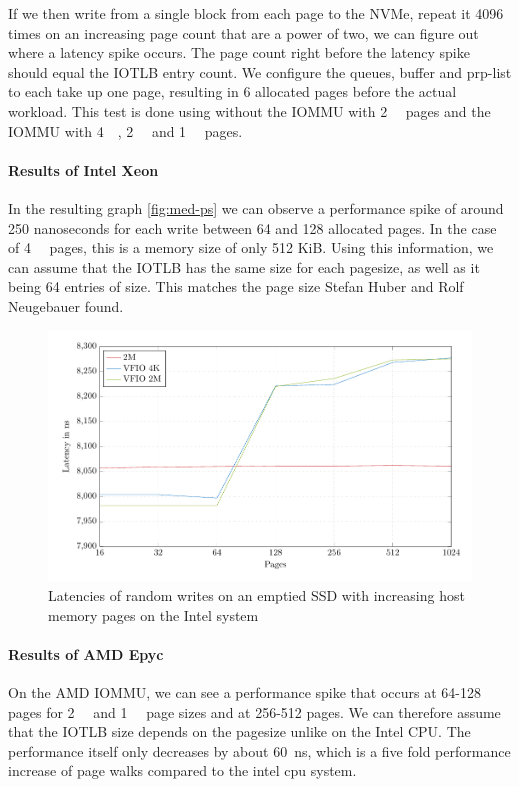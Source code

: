 If we then write from a single block from each page to the NVMe, repeat it 4096 times on an increasing page count that are a power of two, we can figure out where a latency spike occurs. The page count right before the latency spike should equal the IOTLB entry count. We configure the queues, buffer and prp-list to each take up one page, resulting in 6 allocated pages before the actual workload. This test is done using without the IOMMU with \qty{2}{\mebi\byte} pages and the IOMMU with \qty{4}{\kibi\byte}, \qty{2}{\mebi\byte} and \qty{1}{\gibi\byte} pages.

\paragraph{Results of Intel Xeon}

In the resulting graph \autoref{fig:med-ps} we can observe a performance spike of around 250 nanoseconds for each write between 64 and 128 allocated pages. In the case of \qty{4}{\kibi\byte} pages, this is a memory size of only 512 KiB. Using this information, we can assume that the IOTLB has the same size for each pagesize, as well as it being 64 entries of size. This matches the page size Stefan Huber and Rolf Neugebauer found.

\begin{figure}[H]
  \centering
  \includegraphics[width=\textwidth]{figures/psmeds}
  \caption{Latencies of random writes on an emptied SSD with increasing host memory pages on the Intel system}
  \label{fig:med-ps}
\end{figure}

\paragraph{Results of AMD Epyc}
On the AMD IOMMU, we can see a performance spike that occurs at 64-128 pages for \qty{2}{\mebi\byte} and \qty{1}{\gibi\byte} page sizes and at 256-512 pages. We can therefore assume that the IOTLB size depends on the pagesize unlike on the Intel CPU. The performance itself only decreases by about \qty{60}{ns}, which is a five fold performance increase of page walks compared to the intel cpu system.

